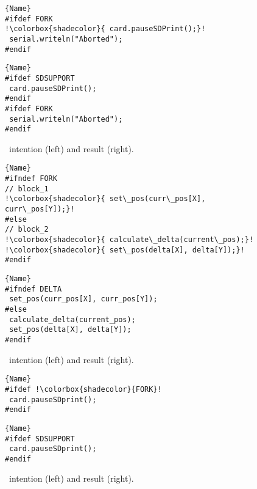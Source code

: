 \begin{figure}[ht]
    \centering
    \begin{minipage}{.40\textwidth}
\begin{lstlisting}[caption=Wrapped code by PC,escapechar=!]{Name}
#ifdef FORK
!\colorbox{shadecolor}{ card.pauseSDPrint();}!
 serial.writeln("Aborted");
#endif
\end{lstlisting}
\end{minipage}\qquad
\begin{minipage}{.40\textwidth}
\begin{lstlisting}[caption=Unwrapped code,escapechar=!]{Name}
#ifdef SDSUPPORT
 card.pauseSDPrint();
#endif
#ifdef FORK
 serial.writeln("Aborted");
#endif
\end{lstlisting}
    \end{minipage}
    \caption{\keepasf~intention (left) and result (right).}
    \label{fig:keepasfeature}
\end{figure}

\begin{figure}[ht]
    \centering
    \begin{minipage}{.50\textwidth}
\begin{lstlisting}[caption=Wrapped code by PC,escapechar=!]{Name}
#ifndef FORK
// block_1
!\colorbox{shadecolor}{ set\_pos(curr\_pos[X], curr\_pos[Y]);}!
#else
// block_2
!\colorbox{shadecolor}{ calculate\_delta(current\_pos);}!
!\colorbox{shadecolor}{ set\_pos(delta[X], delta[Y]);}!
#endif
\end{lstlisting}
\end{minipage}\qquad
\begin{minipage}{.50\textwidth}
\begin{lstlisting}[caption=Unwrapped code,escapechar=!]{Name}
#ifndef DELTA
 set_pos(curr_pos[X], curr_pos[Y]);
#else
 calculate_delta(current_pos);
 set_pos(delta[X], delta[Y]);
#endif
\end{lstlisting}
    \end{minipage}
    \caption{\excl~intention (left) and result (right).}
    \label{fig:exclusive}
\end{figure}

\begin{figure}[ht]
    \centering
    \begin{minipage}{.35\textwidth}
\begin{lstlisting}[caption=Wrapped code by PC,escapechar=!]{Name}
#ifdef !\colorbox{shadecolor}{FORK}!
 card.pauseSDprint();
#endif
\end{lstlisting}
\end{minipage}\qquad
\begin{minipage}{.35\textwidth}
\begin{lstlisting}[caption=Unwrapped code,escapechar=!]{Name}
#ifdef SDSUPPORT
 card.pauseSDprint();
#endif
\end{lstlisting}
    \end{minipage}
    \caption{\changepc~intention (left) and result (right).}
    \label{fig:assignfeature}
\end{figure}